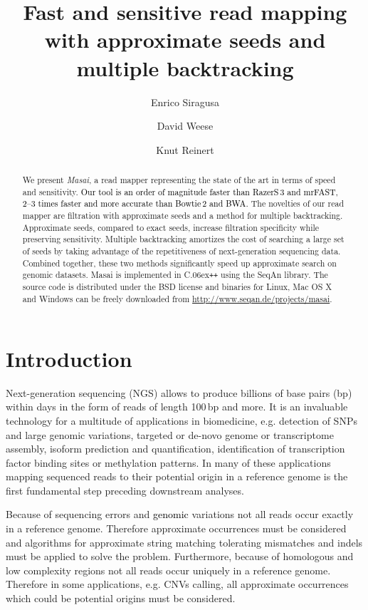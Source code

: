 \documentclass[a4,center,fleqn]{article}
\newcommand{\eg}{{e.g.}\xspace}
\newcommand{\CC}{C\raise.06ex\hbox{\tt ++}\xspace}
\begin{document}
\title{Fast and sensitive read mapping with approximate seeds and multiple backtracking}

\author{Enrico Siragusa}
\author{David Weese}
\author{Knut Reinert}


\maketitle

\begin{abstract}
We present \emph{Masai}, a read mapper representing the state of the art in terms of speed and sensitivity.
\textcolor{black}{Our tool is an order of magnitude faster than RazerS\,3 and mrFAST, 2--3 times faster and more accurate than Bowtie\,2 and BWA.}
The novelties of our read mapper are filtration with approximate seeds and a method for multiple backtracking.
Approximate seeds, compared to exact seeds, increase filtration specificity while preserving sensitivity.
Multiple backtracking amortizes the cost of searching a large set of seeds by taking advantage of the repetitiveness of next-generation sequencing data.
Combined together, these two methods significantly speed up approximate search on genomic datasets.
Masai is implemented in \CC using the SeqAn library.
The source code is distributed under the BSD license and binaries for Linux, Mac OS X and Windows can be freely downloaded from \url{http://www.seqan.de/projects/masai}.
\end{abstract}



\section{Introduction}

Next-generation sequencing (NGS) allows to produce billions of base pairs (bp) within days in the form of reads of length 100\,bp and more.
It is an invaluable technology for a multitude of applications in biomedicine, \eg detection of SNPs and large genomic variations, targeted or de-novo genome or transcriptome assembly, isoform prediction and quantification, identification of transcription factor binding sites or methylation patterns.
In many of these applications mapping sequenced reads to their potential origin in a reference genome is the first fundamental step preceding downstream analyses.

Because of sequencing errors and \textcolor{black}{genomic} variations not all reads occur exactly in a reference genome.
Therefore approximate occurrences must be considered and algorithms for approximate string matching tolerating mismatches and indels must be applied to solve the problem.
Furthermore, because of homologous and low complexity regions not all reads occur uniquely in a reference genome.
Therefore in some applications, \eg CNVs calling, all approximate occurrences which could be potential origins must be considered.
\end{document}
